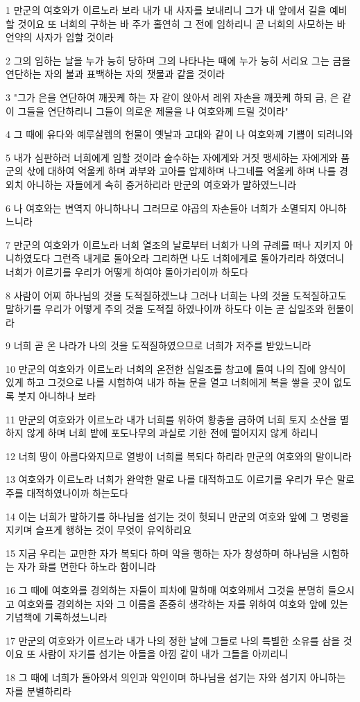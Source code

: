 \par 1 만군의 여호와가 이르노라 보라 내가 내 사자를 보내리니 그가 내 앞에서 길을 예비할 것이요 또 너희의 구하는 바 주가 홀연히 그 전에 임하리니 곧 너희의 사모하는 바 언약의 사자가 임할 것이라
\par 2 그의 임하는 날을 누가 능히 당하며 그의 나타나는 때에 누가 능히 서리요 그는 금을 연단하는 자의 불과 표백하는 자의 잿물과 같을 것이라
\par 3 "그가 은을 연단하여 깨끗케 하는 자 같이 앉아서 레위 자손을 깨끗케 하되 금, 은 같이 그들을 연단하리니 그들이 의로운 제물을 나 여호와께 드릴 것이라"
\par 4 그 때에 유다와 예루살렘의 헌물이 옛날과 고대와 같이 나 여호와께 기쁨이 되려니와
\par 5 내가 심판하러 너희에게 임할 것이라 술수하는 자에게와 거짓 맹세하는 자에게와 품군의 삯에 대하여 억울케 하며 과부와 고아를 압제하며 나그네를 억울케 하며 나를 경외치 아니하는 자들에게 속히 증거하리라 만군의 여호와가 말하였느니라
\par 6 나 여호와는 변역지 아니하나니 그러므로 야곱의 자손들아 너희가 소멸되지 아니하느니라
\par 7 만군의 여호와가 이르노라 너희 열조의 날로부터 너희가 나의 규례를 떠나 지키지 아니하였도다 그런즉 내게로 돌아오라 그리하면 나도 너희에게로 돌아가리라 하였더니 너희가 이르기를 우리가 어떻게 하여야 돌아가리이까 하도다
\par 8 사람이 어찌 하나님의 것을 도적질하겠느냐 그러나 너희는 나의 것을 도적질하고도 말하기를 우리가 어떻게 주의 것을 도적질 하였나이까 하도다 이는 곧 십일조와 헌물이라
\par 9 너희 곧 온 나라가 나의 것을 도적질하였으므로 너희가 저주를 받았느니라
\par 10 만군의 여호와가 이르노라 너희의 온전한 십일조를 창고에 들여 나의 집에 양식이 있게 하고 그것으로 나를 시험하여 내가 하늘 문을 열고 너희에게 복을 쌓을 곳이 없도록 붓지 아니하나 보라
\par 11 만군의 여호와가 이르노라 내가 너희를 위하여 황충을 금하여 너희 토지 소산을 멸하지 않게 하며 너희 밭에 포도나무의 과실로 기한 전에 떨어지지 않게 하리니
\par 12 너희 땅이 아름다와지므로 열방이 너희를 복되다 하리라 만군의 여호와의 말이니라
\par 13 여호와가 이르노라 너희가 완악한 말로 나를 대적하고도 이르기를 우리가 무슨 말로 주를 대적하였나이까 하는도다
\par 14 이는 너희가 말하기를 하나님을 섬기는 것이 헛되니 만군의 여호와 앞에 그 명령을 지키며 슬프게 행하는 것이 무엇이 유익하리요
\par 15 지금 우리는 교만한 자가 복되다 하며 악을 행하는 자가 창성하며 하나님을 시험하는 자가 화를 면한다 하노라 함이니라
\par 16 그 때에 여호와를 경외하는 자들이 피차에 말하매 여호와께서 그것을 분명히 들으시고 여호와를 경외하는 자와 그 이름을 존중히 생각하는 자를 위하여 여호와 앞에 있는 기념책에 기록하셨느니라
\par 17 만군의 여호와가 이르노라 내가 나의 정한 날에 그들로 나의 특별한 소유를 삼을 것이요 또 사람이 자기를 섬기는 아들을 아낌 같이 내가 그들을 아끼리니
\par 18 그 때에 너희가 돌아와서 의인과 악인이며 하나님을 섬기는 자와 섬기지 아니하는 자를 분별하리라

